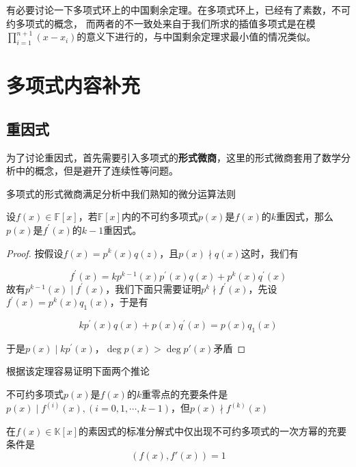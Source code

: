\documentclass{ctexart}
\begin{document}
有必要讨论一下多项式环上的中国剩余定理。在多项式环上，已经有了素数，不可约多项式的概念，
而两者的不一致处来自于我们所求的插值多项式是在模$\prod_{i = 1}^{n + 1}(x - x_i)$的意义下进行的，与中国剩余定理求最小值的情况类似。


\section{多项式内容补充}

\subsection{重因式}

为了讨论重因式，首先需要引入多项式的\textbf{形式微商}，这里的形式微商套用了数学分析中的概念，但是避开了连续性等问题。

\begin{lemma}
    多项式的形式微商满足分析中我们熟知的微分运算法则
\end{lemma}

\begin{theorem}
    设$f(x) \in \mathbb{F}[x]$，若$\mathbb{F}[x]$内的不可约多项式$p(x)$是$f(x)$的$k$重因式，那么$p(x)$是$f^\prime(x)$的$k - 1$重因式。
\end{theorem}
\begin{proof}
    按假设$f(x) = p^k(x) q(z)$，且$p(x) \nmid q(x)$这时，我们有
    
    \begin{equation*}
        f^\prime(x) = kp^{k-1}(x)p^\prime(x)q(x) + p^k(x)q^\prime(x) 
    \end{equation*}
    故有$p^{k-1}(x) \mid f^\prime(x)$，我们下面只需要证明$p^k \nmid f^\prime (x)$，先设$f^\prime(x) = p^k(x)q_1(x)$，于是有

    \begin{equation*}
        kp^\prime(x) q(x) + p(x)q^\prime(x) = p(x) q_1(x)
    \end{equation*}

    于是$p(x) \mid kp^\prime (x)$，$\deg p(x) > \deg p'(x)$矛盾
\end{proof}

根据该定理容易证明下面两个推论

\begin{corollary}
    不可约多项式$p(x)$是$f(x)$的$k$重零点的充要条件是$p(x) \mid f^{(i)}(x), (i = 0,1,\cdots,k-1)$，但$p(x) \nmid f^{(k)}(x)$
\end{corollary}

\begin{corollary}
    在$f(x) \in \mathbb{K}[x]$的素因式的标准分解式中仅出现不可约多项式的一次方幂的充要条件是
    \begin{equation*}
        (f(x),f'(x)) = 1
    \end{equation*}
\end{corollary}
\end{document}
